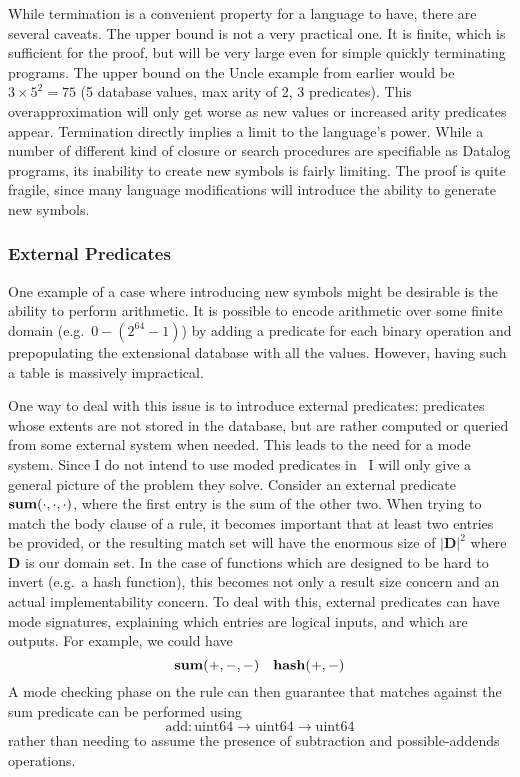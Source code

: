 While termination is a convenient property for a language to have, there are several caveats.
%
The upper bound is not a very practical one.
It is finite, which is sufficient for the proof, but will be very large even for simple quickly terminating programs.
The upper bound on the Uncle example from earlier would be $3 \times 5^2 = 75$ (5 database values, max arity of 2, 3 predicates).
This overapproximation will only get worse as new values or increased arity predicates appear.
%
Termination directly implies a limit to the language's power.
While a number of different kind of closure or search procedures are specifiable as Datalog programs, its inability to create new symbols is fairly limiting.
%
The proof is quite fragile, since many language modifications will introduce the ability to generate new symbols.
\subsubsection{External Predicates}
\label{sec:extpred}
One example of a case where introducing new symbols might be desirable is the ability to perform arithmetic.
It is possible to encode arithmetic over some finite domain (e.g.\ $0-(2^{64} - 1)$) by adding a predicate for each binary operation and prepopulating the extensional database with all the values.
However, having such a table is massively impractical.

One way to deal with this issue is to introduce external predicates: predicates whose extents are not stored in the database, but are rather computed or queried from some external system when needed.
This leads to the need for a mode system.
Since I do not intend to use moded predicates in \sysname\, I will only give a general picture of the problem they solve.
Consider an external predicate ${\bf sum}(\cdot, \cdot, \cdot)$, where the first entry is the sum of the other two.
When trying to match the body clause of a rule, it becomes important that at least two entries be provided, or the resulting match set will have the enormous size of $|\mathbf{D}|^2$ where $\mathbf{D}$ is our domain set.
In the case of functions which are designed to be hard to invert (e.g.\ a hash function), this becomes not only a result size concern and an actual implementability concern.
To deal with this, external predicates can have mode signatures, explaining which entries are logical inputs, and which are outputs. For example, we could have
\[
        {\bf sum}(+, -, -) \quad {\bf hash}(+, -)
\]
A mode checking phase on the rule can then guarantee that matches against the sum predicate can be performed using
\[
        \textrm{add} : \textrm{uint64} \rightarrow \textrm{uint64} \rightarrow \textrm{uint64}
\]
rather than needing to assume the presence of subtraction and possible-addends operations.

